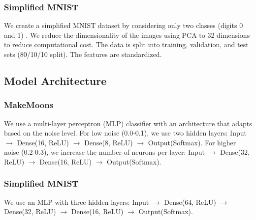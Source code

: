 \documentclass[conference]{IEEEtran}
\begin{document}
\subsubsection{Simplified MNIST}
We create a simplified MNIST dataset by considering only two classes (digits 0 and 1) \cite{lecun1998gradient}. We reduce the dimensionality of the images using PCA to 32 dimensions to reduce computational cost.  The data is split into training, validation, and test sets (80/10/10 split). The features are standardized.

\subsection{Model Architecture}

\subsubsection{MakeMoons}
We use a multi-layer perceptron (MLP) classifier with an architecture that adapts based on the noise level. For low noise (0.0-0.1), we use two hidden layers: Input $\rightarrow$ Dense(16, ReLU) $\rightarrow$ Dense(8, ReLU) $\rightarrow$ Output(Softmax). For higher noise (0.2-0.3), we increase the number of neurons per layer: Input $\rightarrow$ Dense(32, ReLU) $\rightarrow$ Dense(16, ReLU) $\rightarrow$ Output(Softmax).

\subsubsection{Simplified MNIST}
We use an MLP with three hidden layers: Input $\rightarrow$ Dense(64, ReLU) $\rightarrow$ Dense(32, ReLU) $\rightarrow$ Dense(16, ReLU) $\rightarrow$ Output(Softmax).
\end{document}
